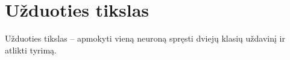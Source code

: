 \section{Užduoties tikslas}
\label{sec:uzduoties_tikslas}

Užduoties tikslas – apmokyti vieną neuroną spręsti dviejų klasių uždavinį ir atlikti tyrimą.